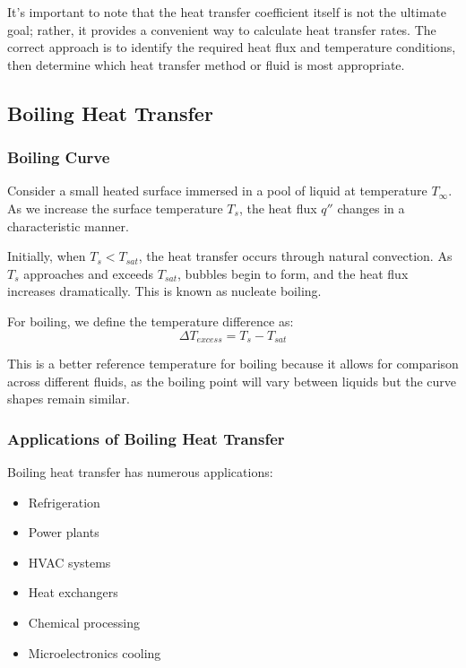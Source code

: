 It's important to note that the heat transfer coefficient itself is not the ultimate goal; rather, it provides a convenient way to calculate heat transfer rates. The correct approach is to identify the required heat flux and temperature conditions, then determine which heat transfer method or fluid is most appropriate.
\subsection*{Boiling Heat Transfer}
\subsubsection*{Boiling Curve}
Consider a small heated surface immersed in a pool of liquid at temperature $T_{\infty}$. As we increase the surface temperature $T_s$, the heat flux $q''$ changes in a characteristic manner.

Initially, when $T_s < T_{sat}$, the heat transfer occurs through natural convection. As $T_s$ approaches and exceeds $T_{sat}$, bubbles begin to form, and the heat flux increases dramatically. This is known as nucleate boiling.

For boiling, we define the temperature difference as:
\[
\Delta T_{excess} = T_s - T_{sat}
\]

This is a better reference temperature for boiling because it allows for comparison across different fluids, as the boiling point will vary between liquids but the curve shapes remain similar.
\subsubsection*{Applications of Boiling Heat Transfer}
Boiling heat transfer has numerous applications:
\begin{itemize}
    \item Refrigeration
    \item Power plants
    \item HVAC systems
    \item Heat exchangers
    \item Chemical processing
    \item Microelectronics cooling
\end{itemize}

